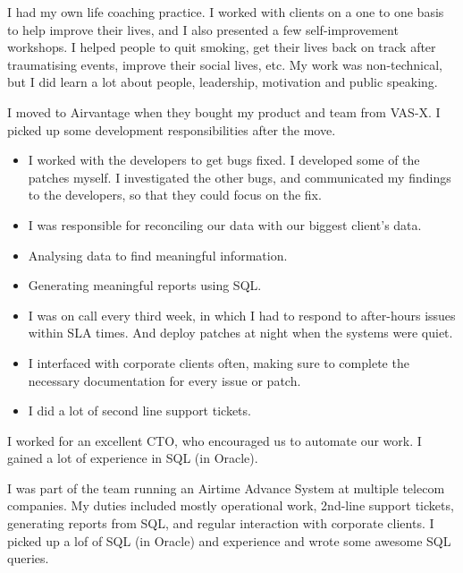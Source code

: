 \documentclass[a4paper]{twentysecondcv} %
\begin{document}
\begin{twenty}
    {I had my own life coaching practice. I worked with clients on a one to one basis to help improve their lives, and I also presented a few self-improvement workshops. I helped people to quit smoking, get their lives back on track after traumatising events, improve their social lives, etc. My work was non-technical, but I did learn a lot about people, leadership, motivation and public speaking.}
    {I moved to Airvantage when they bought my product and team from VAS-X. I picked up some development responsibilities after the move.
    \begin{itemize}
        \item I worked with the developers to get bugs fixed. I developed some of the patches myself. I investigated the other bugs, and communicated my findings to the developers, so that they could focus on the fix.
        \item I was responsible for reconciling our data with our biggest client's data.
        \item Analysing data to find meaningful information.
        \item Generating meaningful reports using SQL.
        \item I was on call every third week, in which I had to respond to after-hours issues within SLA times. And deploy patches at night when the systems were quiet.
        \item I interfaced with corporate clients often, making sure to complete the necessary documentation for every issue or patch.
        \item I did a lot of second line support tickets.
    \end{itemize}
    I worked for an excellent CTO, who encouraged us to automate our work. I gained a lot of experience in SQL (in Oracle).}
    {I was part of the team running an Airtime Advance System at multiple telecom companies. My duties included mostly operational work, 2nd-line support tickets, generating reports from SQL, and regular interaction with corporate clients. I picked up a lof of SQL (in Oracle) and experience and wrote some awesome SQL queries.}


\end{twenty}
\end{document}
